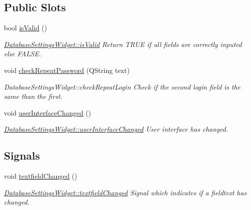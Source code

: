 \subsection*{Public Slots}
\begin{DoxyCompactItemize}
\item 
bool \hyperlink{classGui_1_1Widgets_1_1DatabaseSettingsWidget_a8b7f1184a885ca63edce7957b74751c6}{is\-Valid} ()
\begin{DoxyCompactList}\small\item\em \hyperlink{classGui_1_1Widgets_1_1DatabaseSettingsWidget_a8b7f1184a885ca63edce7957b74751c6}{Database\-Settings\-Widget\-::is\-Valid} Return T\-R\-U\-E if all fields are correctly inputed else F\-A\-L\-S\-E. \end{DoxyCompactList}\item 
\hypertarget{classGui_1_1Widgets_1_1DatabaseSettingsWidget_a99bb50cd3d4eb68c5b8d9b20a983a605}{void \hyperlink{classGui_1_1Widgets_1_1DatabaseSettingsWidget_a99bb50cd3d4eb68c5b8d9b20a983a605}{check\-Repeat\-Password} (Q\-String text)}\label{classGui_1_1Widgets_1_1DatabaseSettingsWidget_a99bb50cd3d4eb68c5b8d9b20a983a605}

\begin{DoxyCompactList}\small\item\em Database\-Settings\-Widget\-::check\-Repeat\-Login Check if the second login field is the same than the first. \end{DoxyCompactList}\item 
\hypertarget{classGui_1_1Widgets_1_1DatabaseSettingsWidget_a063c346b830524fb1f96f32984fb5493}{void \hyperlink{classGui_1_1Widgets_1_1DatabaseSettingsWidget_a063c346b830524fb1f96f32984fb5493}{user\-Interface\-Changed} ()}\label{classGui_1_1Widgets_1_1DatabaseSettingsWidget_a063c346b830524fb1f96f32984fb5493}

\begin{DoxyCompactList}\small\item\em \hyperlink{classGui_1_1Widgets_1_1DatabaseSettingsWidget_a063c346b830524fb1f96f32984fb5493}{Database\-Settings\-Widget\-::user\-Interface\-Changed} User interface has changed. \end{DoxyCompactList}\end{DoxyCompactItemize}
\subsection*{Signals}
\begin{DoxyCompactItemize}
\item 
\hypertarget{classGui_1_1Widgets_1_1DatabaseSettingsWidget_a6947626c7bb6807572e0a49ef2f53c70}{void \hyperlink{classGui_1_1Widgets_1_1DatabaseSettingsWidget_a6947626c7bb6807572e0a49ef2f53c70}{textfield\-Changed} ()}\label{classGui_1_1Widgets_1_1DatabaseSettingsWidget_a6947626c7bb6807572e0a49ef2f53c70}

\begin{DoxyCompactList}\small\item\em \hyperlink{classGui_1_1Widgets_1_1DatabaseSettingsWidget_a6947626c7bb6807572e0a49ef2f53c70}{Database\-Settings\-Widget\-::textfield\-Changed} Signal which indicates if a fieldtext has changed. \end{DoxyCompactList}\end{DoxyCompactItemize}
